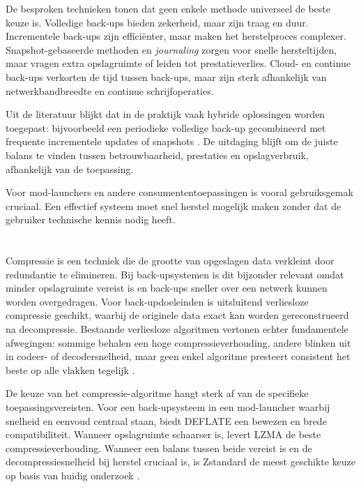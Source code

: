 De besproken technieken tonen dat geen enkele methode universeel de beste keuze is. Volledige back-ups bieden zekerheid, maar zijn traag en duur. Incrementele back-ups zijn efficiënter, maar maken het herstelproces complexer. Snapshot-gebaseerde methoden en \textit{journaling} zorgen voor snelle hersteltijden, maar vragen extra opslagruimte of leiden tot prestatieverlies. Cloud- en continue back-ups verkorten de tijd tussen back-ups, maar zijn sterk afhankelijk van netwerkbandbreedte en continue schrijfoperaties.

Uit de literatuur blijkt dat in de praktijk vaak hybride oplossingen worden toegepast: bijvoorbeeld een periodieke volledige back-up gecombineerd met frequente incrementele updates of snapshots \autocite{McBride2020}. De uitdaging blijft om de juiste balans te vinden tussen betrouwbaarheid, prestaties en opslagverbruik, afhankelijk van de toepassing.

Voor mod-launchers en andere consumententoepassingen is vooral gebruiksgemak cruciaal. Een effectief systeem moet snel herstel mogelijk maken zonder dat de gebruiker technische kennis nodig heeft.

\section{}%
\label{sec:bestandscompressie}

Compressie is een techniek die de grootte van opgeslagen data verkleint door redundantie te elimineren. Bij back-upsystemen is dit bijzonder relevant omdat minder opslagruimte vereist is en back-ups sneller over een netwerk kunnen worden overgedragen. Voor back-updoeleinden is uitsluitend verliesloze compressie geschikt, waarbij de originele data exact kan worden gereconstrueerd na decompressie. Bestaande verliesloze algoritmen vertonen echter fundamentele afwegingen: sommige behalen een hoge compressieverhouding, andere blinken uit in codeer- of decodersnelheid, maar geen enkel algoritme presteert consistent het beste op alle vlakken tegelijk \autocite{Rahman2025}.

De keuze van het compressie-algoritme hangt sterk af van de specifieke toepassingsvereisten. Voor een back-upsysteem in een mod-launcher waarbij snelheid en eenvoud centraal staan, biedt DEFLATE een bewezen en brede compatibiliteit. Wanneer opslagruimte schaarser is, levert LZMA de beste compressieverhouding. Wanneer een balans tussen beide vereist is en de decompressiesnelheid bij herstel cruciaal is, is Zstandard de meest geschikte keuze op basis van huidig onderzoek \autocite{Matt2025}.